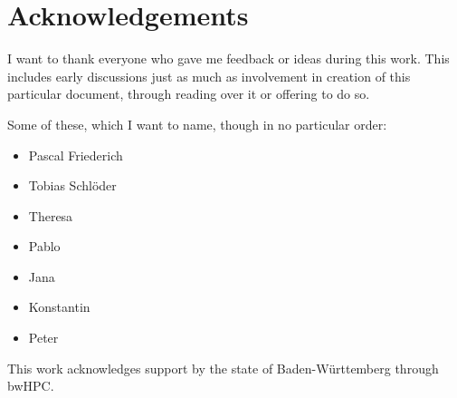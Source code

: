 \chapter{Acknowledgements}


I want to thank everyone who gave me feedback or ideas during this work.
This includes early discussions just as much as involvement in creation of this particular document, through reading over it or offering to do so.

Some of these, which I want to name, though in no particular order:
\begin{itemize}
    \item Pascal Friederich
    \item Tobias Schlöder
    \item Theresa
    \item Pablo
    \item Jana
    \item Konstantin
    \item Peter
\end{itemize}

\vfill

This work acknowledges support by the state of Baden-Württemberg through bwHPC.
